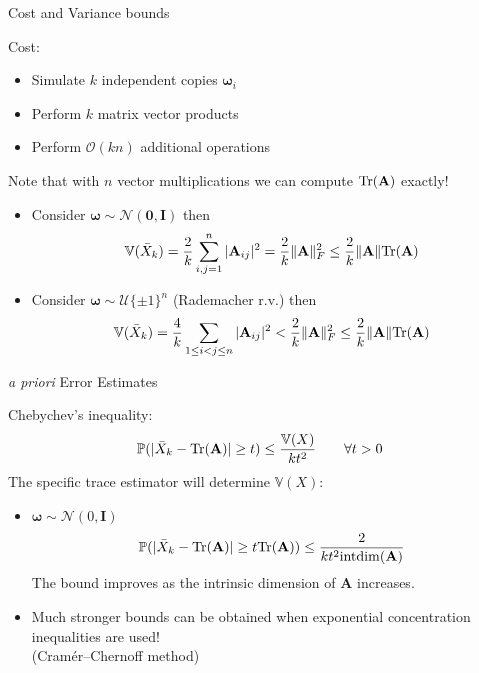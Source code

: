 \documentclass{beamer}
\newcommand{\bgk}[1]{\boldsymbol{#1}}
\newcommand{\bzero}{\bgk{0}}
\newcommand{\bomega}{\bgk{\omega}}
\newcommand{\bvec}[1]{\mathbf{#1}}
\newcommand{\vA}{\bvec{A}}
\newcommand{\vI}{\bvec{I}}
\newcommand{\bitem}{\item[$\bullet$]}
\begin{document}
\begin{frame}{Cost and Variance bounds}

Cost:
\begin{itemize}
    \bitem Simulate $k$ independent copies $\bomega_i$
    \bitem Perform $k$ matrix vector products
    \bitem Perform $\mathcal{O}(kn)$ additional operations
\end{itemize}
\begin{center}
Note that with $n$ vector multiplications we can compute ${\rm Tr} (\vA)$ exactly!     

\begin{itemize}
    \bitem [Girard 1989] Consider $\bomega \sim \mathcal{N}(\bzero, \vI)$  then
    $$
    \mathbb{V} (\bar{X}_k)
    =
    \frac{2}{k}
    \sum_{i,j=1 }^n |\vA_{ij}|^2
    = 
    \frac{2}{k} \Vert \vA \Vert_F^2
    \leq 
    \frac{2}{k} \Vert \vA \Vert {\rm Tr}(\vA)
    $$
    \bitem [Hutchinson 1990] Consider $\bomega \sim \mathcal{U}\{\pm 1\}^n$ (Rademacher r.v.) then 
    $$
    \mathbb{V} (\bar{X}_k)
    =
    \frac{4}{k}
    \sum_{1\leq i<j\leq n } |\vA_{ij}|^2
    < 
    \frac{2}{k} \Vert \vA \Vert_F^2
    \leq 
    \frac{2}{k} \Vert \vA \Vert {\rm Tr}(\vA)
    $$
\end{itemize}
\end{center}

\end{frame}


\begin{frame}{{\it a priori} Error Estimates}

Chebychev's inequality:
$$
\mathbb{P}(|\bar{X}_k - {\rm Tr}(\vA)| \geq t)
\leq
\frac{\mathbb{V}(X)}{kt^2} \qquad \forall t > 0 
$$
The specific trace estimator will determine $\mathbb{V}(X)$:
\begin{itemize}
    \bitem [Girard 1989] $\bomega \sim \mathcal{N}(0,\vI)$
    $$
    \mathbb{P}(|\bar{X}_k - {\rm Tr}(\vA)| \geq t {\rm Tr}(\vA))
    \leq
    \frac{2}{k  t^2 {\rm intdim}(\vA)}
    $$
    The bound improves as the intrinsic dimension of $\vA$ increases.
    \bitem Much stronger bounds can be obtained when exponential concentration inequalities are used!\\
    (Cram\'er--Chernoff method)
\end{itemize}

\end{frame}
\end{document}
